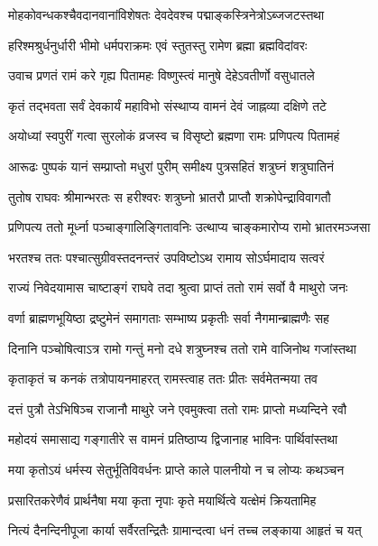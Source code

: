 \twolineshloka
{मोहकोवन्धकश्चैवदानवानांविशेषतः}
{देवदेवश्च पद्माङ्कस्त्रिनेत्रोऽब्जजटस्तथा}%

\twolineshloka
{हरिश्मश्रुर्धनुर्धारी भीमो धर्मपराक्रमः}
{एवं स्तुतस्तु रामेण ब्रह्मा ब्रह्मविदांवरः}%

\twolineshloka
{उवाच प्रणतं रामं करे गृह्य पितामहः}
{विष्णुस्त्वं मानुषे देहेऽवतीर्णो वसुधातले}%

\twolineshloka
{कृतं तद्भवता सर्वं देवकार्यं महाविभो}
{संस्थाप्य वामनं देवं जाह्नव्या दक्षिणे तटे}%

\twolineshloka
{अयोध्यां स्वपुरीं गत्वा सुरलोकं व्रजस्व च}
{विसृष्टो ब्रह्मणा रामः प्रणिपत्य पितामहं}%

\twolineshloka
{आरूढः पुष्पकं यानं सम्प्राप्तो मधुरां पुरीम्}
{समीक्ष्य पुत्रसहितं शत्रुघ्नं शत्रुघातिनं}%

\twolineshloka
{तुतोष राघवः श्रीमान्भरतः स हरीश्वरः}
{शत्रुघ्नो भ्रातरौ प्राप्तौ शक्रोपेन्द्राविवागतौ}%

\twolineshloka
{प्रणिपत्य ततो मूर्ध्ना पञ्चाङ्गालिङ्गितावनिः}
{उत्थाप्य चाङ्कमारोप्य रामो भ्रातरमञ्जसा}%

\twolineshloka
{भरतश्च ततः पश्चात्सुग्रीवस्तदनन्तरं}
{उपविष्टोऽथ रामाय सोऽर्घमादाय सत्वरं}%

\twolineshloka
{राज्यं निवेदयामास चाष्टाङ्गं राघवे तदा}
{श्रुत्वा प्राप्तं ततो रामं सर्वो वै माथुरो जनः}%

\twolineshloka
{वर्णा ब्राह्मणभूयिष्ठा द्रष्टुमेनं समागताः}
{सम्भाष्य प्रकृतीः सर्वा नैगमान्ब्राह्मणैः सह}%

\twolineshloka
{दिनानि पञ्चोषित्वाऽत्र रामो गन्तुं मनो दधे}
{शत्रुघ्नश्च ततो रामे वाजिनोथ गजांस्तथा}%

\twolineshloka
{कृताकृतं च कनकं तत्रोपायनमाहरत्}
{रामस्त्वाह ततः प्रीतः सर्वमेतन्मया तव}%

\twolineshloka
{दत्तं पुत्रौ तेऽभिषिञ्च राजानौ माथुरे जने}
{एवमुक्त्वा ततो रामः प्राप्तो मध्यन्दिने रवौ}%

\twolineshloka
{महोदयं समासाद्य गङ्गातीरे स वामनं}
{प्रतिष्ठाप्य द्विजानाह भाविनः पार्थिवांस्तथा}%

\twolineshloka
{मया कृतोऽयं धर्मस्य सेतुर्भूतिविवर्धनः}
{प्राप्ते काले पालनीयो न च लोप्यः कथञ्चन}%

\twolineshloka
{प्रसारितकरेणैवं प्रार्थनैषा मया कृता}
{नृपाः कृते मयार्थित्वे यत्क्षेमं क्रियतामिह}%

\twolineshloka
{नित्यं दैनन्दिनीपूजा कार्या सर्वैरतन्द्रितैः}
{ग्रामान्दत्वा धनं तच्च लङ्काया आहृतं च यत्}%

